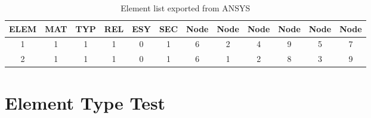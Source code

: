 \begin{table}
	\begin{center}
		\caption{Element list exported from ANSYS}\label{tab: element_list}
		\begin{tabular}{ cccccccccccc }
			\hline			
			ELEM & MAT & TYP & REL & ESY & SEC & Node & Node  & Node & Node & Node & Node\\ \hline
			1 & 1 & 1 & 1 & 0 & 1 & 6 & 2 & 4 & 9 & 5 & 7 \\
			2 & 1 & 1 & 1 & 0 & 1 & 6 & 1 & 2 & 8 & 3 & 9 \\
			\hline  
		\end{tabular}		
	\end{center}	
\end{table}

\chapter{Element Type Test}

